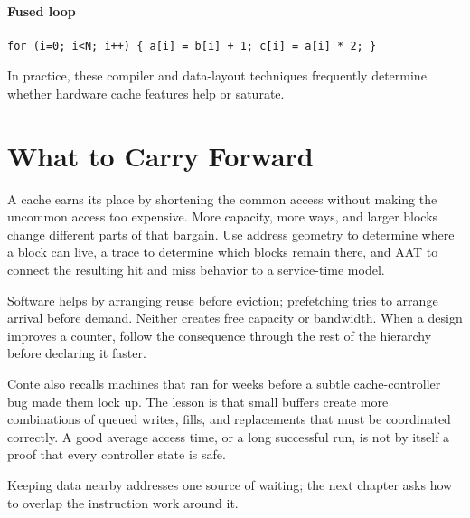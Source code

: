 \paragraph{Fused loop}
\begin{verbatim}
for (i=0; i<N; i++) { a[i] = b[i] + 1; c[i] = a[i] * 2; }
\end{verbatim}

In practice, these compiler and data-layout techniques frequently determine whether hardware cache features help or saturate.


\section{What to Carry Forward}\label{sec:auto-033}
A cache earns its place by shortening the common access without making the uncommon access too expensive.
More capacity, more ways, and larger blocks change different parts of that bargain.
Use address geometry to determine where a block can live, a trace to determine which blocks remain there, and AAT to connect the resulting hit and miss behavior to a service-time model.

Software helps by arranging reuse before eviction; prefetching tries to arrange arrival before demand.
Neither creates free capacity or bandwidth.
When a design improves a counter, follow the consequence through the rest of the hierarchy before declaring it faster.

Conte also recalls machines that ran for weeks before a subtle cache-controller bug made them lock up.
The lesson is that small buffers create more combinations of queued writes, fills, and replacements that must be coordinated correctly.
A good average access time, or a long successful run, is not by itself a proof that every controller state is safe.

Keeping data nearby addresses one source of waiting; the next chapter asks how to overlap the instruction work around it.


